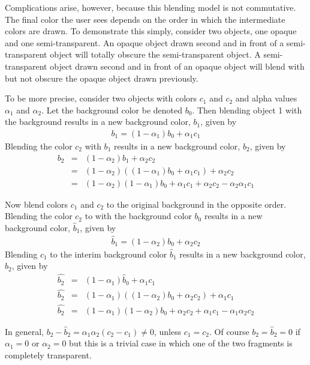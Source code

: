 \documentclass[11pt,twoside]{book}
\begin{document}
Complications arise, however, because this blending model is not
commutative.  The final color the user sees depends on the order
in which the intermediate colors are drawn. To demonstrate this
simply, consider two objects, one opaque and one semi-transparent.
An opaque object drawn second and in front of a semi-transparent
object will totally obscure the semi-transparent object. A
semi-transparent object drawn second and in front of an opaque
object will blend with but not obscure the opaque object drawn
previously.

To be more precise, consider two objects with colors $c_1$ and
$c_2$ and alpha values $\alpha_1$ and $\alpha_2$.   Let the
background color be denoted $b_0$.  Then blending object 1 with
the background results in a new background color, $b_1$, given by
\begin{eqnarray}
b_1=(1-\alpha_1)b_0 + \alpha_1c_1
\end{eqnarray}
Blending the color $c_2$ with $b_1$ results in a new background color, $b_2$, given by
\begin{eqnarray}
b_2&=&(1-\alpha_2)b_1 + \alpha_2c_2\\
&=&(1-\alpha_2)((1-\alpha_1)b_0 + \alpha_1c_1)+\alpha_2c_2\\
&=&(1-\alpha_2)(1-\alpha_1)b_0 + \alpha_1c_1 + \alpha_2c_2 - \alpha_2\alpha_1c_1
\end{eqnarray}

Now blend colors $c_1$ and $c_2$ to the original background in the
opposite order. Blending the color $c_2$ to with the background
color $b_0$ results in a new background color, $\hat{b}_1$, given
by
\begin{eqnarray}
\hat{b}_1=(1-\alpha_2)b_0 + \alpha_2c_2
\end{eqnarray}
Blending $c_1$ to the interim background color $\hat{b}_1$ results in a new background color,
$\hat{b}_2$, given by
\begin{eqnarray}
\hat{b_2}&=&(1-\alpha_1)\hat{b}_0+\alpha_1c_1\\
\hat{b_2}&=&(1-\alpha_1)((1-\alpha_2)b_0 + \alpha_2c_2)+\alpha_1c_1\\
\hat{b_2}&=&(1-\alpha_1)(1-\alpha_2)b_0 + \alpha_2c_2 + \alpha_1c_1 - \alpha_1\alpha_2c_2
\end{eqnarray}


In general, $b_2-\hat{b}_2=\alpha_1\alpha_2(c_2-c_1)\ne 0$, unless
$c_1=c_2$.  Of course $b_2=\hat{b}_2=0$ if $\alpha_1=0$ or
$\alpha_2=0$ but this is a trivial case in which one of the two
fragments is completely transparent.
\end{document}

